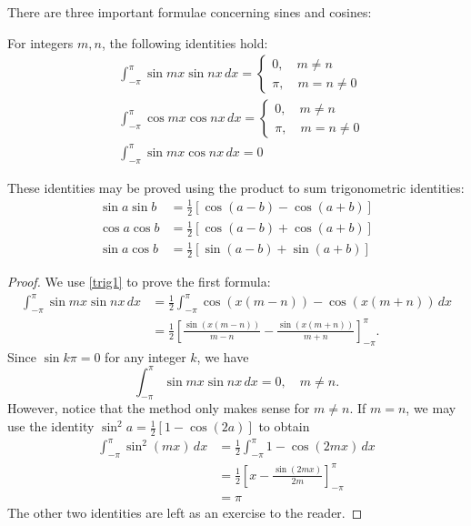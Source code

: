 \documentclass{amsart}
\begin{document}
  There are three important formulae concerning sines and cosines:
  \begin{theorem}
    For integers $m, n$, the following identities hold:
    \begin{align}
      &\int_{-\pi}^{\pi} \sin mx \sin nx\, dx = \begin{cases} 0, \quad m\neq n \\ \pi, \quad m = n \neq 0 \end{cases} \\
      &\int_{-\pi}^{\pi} \cos mx \cos nx\, dx = \begin{cases} 0, \quad m\neq n \\ \pi, \quad m = n \neq 0 \end{cases} \\
      &\int_{-\pi}^{\pi} \sin mx \cos nx\, dx = 0
    \end{align}
  \end{theorem}
  These identities may be proved using the product to sum trigonometric identities:
  \begin{align}
    \sin a \sin b &= \frac{1}{2}[\cos(a-b) - \cos(a+b)] \label{trig1}\\
    \cos a \cos b &= \frac{1}{2} [\cos (a-b) + \cos(a+b)] \label {trig2}\\
    \sin a \cos b &= \frac{1}{2}[\sin (a-b) + \sin(a+b)] \label{trig3}
  \end{align}
  \begin{proof}
    We use \ref{trig1} to prove the first formula:
    \begin{align*}
      \int_{-\pi}^{\pi} \sin mx \sin nx\, dx &= \frac{1}{2} \int_{-\pi}^{\pi} \cos(x(m-n)) - \cos(x(m+n))\, dx \\
                                             &= \frac{1}{2} \left[ \frac{\sin(x(m-n))}{m-n} - \frac{\sin(x(m+n))}{m+n} \right]_{-\pi}^{\pi}.
    \end{align*}
    Since $\sin k\pi = 0$ for any integer $k$, we have \[
      \int_{-\pi}^{\pi} \sin mx \sin nx \, dx = 0, \quad m\neq n
    .\] However, notice that the method only makes sense for $m\neq n$. If $m = n$, we may use the identity $\sin^2 a = \frac{1}{2}[1 - \cos(2a)]$ to obtain 
    \begin{align*}
      \int_{-\pi}^{\pi} \sin^2(mx)\, dx &= \frac{1}{2} \int_{-\pi}^{\pi} 1 - \cos(2mx)\, dx \\
                                        &= \frac{1}{2} \left[ x - \frac{\sin (2mx)}{2m} \right]_{-\pi}^{\pi} \\
                                        &= \pi
    \end{align*}
    The other two identities are left as an exercise to the reader.
  \end{proof}
\end{document}
